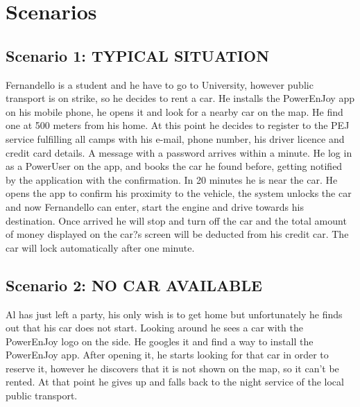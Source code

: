 \section{Scenarios}
\subsection{Scenario 1: TYPICAL SITUATION}
Fernandello is a student and he have to go to University, however public transport is on strike, so he decides to rent a car.  He installs the PowerEnJoy app on his mobile phone, he opens it and look for a nearby car on the map. He find one at 500 meters from his home. At this point he decides to register to the PEJ service fulfilling all camps with his e-mail, phone number, his driver licence and credit card details. A message with a password arrives within a minute. He log in as a PowerUser on the app, and books the car he found before, getting notified by the application with the confirmation. In 20 minutes he is near the car. He opens the app to confirm his proximity to the vehicle, the system unlocks the car and now Fernandello can enter, start the engine and drive towards his destination. Once arrived he will stop and turn off the car and the total amount of money displayed on the car?s screen will be deducted from his credit car. The car will lock automatically after one minute. 
\subsection{Scenario 2: NO CAR AVAILABLE}
Al has just left a party, his only wish is to get home but unfortunately he finds out that his car does not start. Looking around he sees a car with the PowerEnJoy logo on the side. He googles it and find a way to install the PowerEnJoy app. After opening it, he starts looking for that car in order to reserve it, however he discovers that it is not shown on the map, so it can't be rented. At that point he gives up and falls back to the night service of the local public transport.
